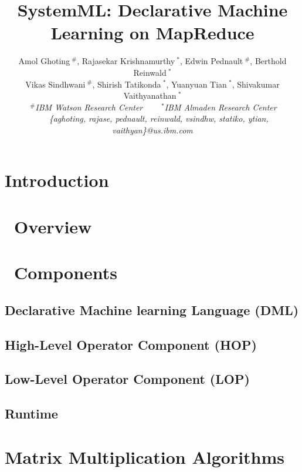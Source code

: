 \documentclass[10pt,conference,letterpaper]{IEEEtran}
\title{SystemML: Declarative Machine Learning on MapReduce}
\author{%
{Amol Ghoting{\small $~^{\#}$}, Rajasekar Krishnamurthy{\small $~^{*}$}, Edwin Pednault{\small $~^{\#}$}, Berthold Reinwald{\small $~^{*}$}} \\
{Vikas Sindhwani{\small $~^{\#}$}, Shirish Tatikonda{\small $~^{*}$}, 
Yuanyuan Tian{\small $~^{*}$}, Shivakumar Vaithyanathan{\small $~^{*}$}} %
\vspace{1.6mm}\\
\fontsize{10}{10}\selectfont\itshape
$~^{\#}$IBM Watson Research Center\ \ \ \ $~^{*}$IBM Almaden Research Center\\
\fontsize{9}{9}\selectfont\ttfamily\upshape
 \ \ \ \{aghoting, rajase, pednault, reinwald, vsindhw, statiko, 
ytian, vaithyan\}@us.ibm.com\\
}
\begin{document}
\maketitle

\begin{abstract} 

\end{abstract}

% 
\section{Introduction}
\label{sec:intro}

\section{\systemmltext\ Overview}
\label{sec:overview}


\section{\systemmltext\ Components}
\label{sec:arch}

\subsection{Declarative Machine learning Language (DML)} 
\label{sec:language}


\subsection{High-Level Operator Component (HOP)}
\label{sec:hops}


\subsection{Low-Level Operator Component (LOP)}
\label{sec:lops}


\subsection{Runtime}
\label{sec:runtime}


\section{Matrix Multiplication Algorithms}
\label{sec:matrixmult}

\end{document}
